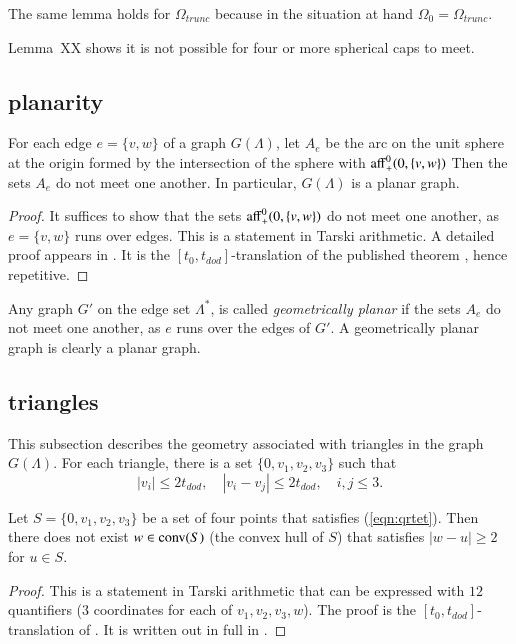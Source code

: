 The same lemma holds
for $\Omega_{trunc}$ because in the situation at hand $\Omega_0=\Omega_{trunc}$.

Lemma~XX shows it is not possible for four or more
spherical caps to meet.

\subsection{planarity}


\begin{lemma}  For each edge $e=\{v,w\}$ of a graph $G(\Lambda)$,
let $A_e$ be the arc on the unit sphere at the origin formed
by the intersection of the sphere with ${\operatorname{aff}}^0_+(0,\{v,w\})$
Then the sets $A_e$ do not meet one another.  In particular,
$G(\Lambda)$ is a planar graph.
\end{lemma}

\begin{proof}  It suffices to show that the sets
${\operatorname{aff}}^0_+(0,\{v,w\})$ do not meet one another, as $e=\{v,w\}$
runs over edges.  This is a statement in Tarski arithmetic.
A detailed proof appears in \cite[Lemma~3.2]{arx}.  
It is the $[t_0,t_{dod}]$-translation
of the published theorem \cite[Lemma~3.10]{Part1}, hence
repetitive.
\end{proof}

Any graph $G'$ on the edge set $\Lambda^*$, is called
{\it geometrically planar} if the sets $A_e$ do not meet one
another, as $e$ runs over the edges of $G'$.  A geometrically
planar graph is clearly a planar graph.

\subsection{triangles}

This subsection describes the geometry associated with
triangles in the graph $G(\Lambda)$.  For each triangle,
there is a set $\{0,v_1,v_2,v_3\}$ such that
\begin{equation}\label{eqn:qrtet}
  |v_i| \le 2t_{dod},\quad |v_i-v_j | \le 2 t_{dod},\quad i,j\le 3.
\end{equation}

\begin{lemma} Let $S=\{0,v_1,v_2,v_3\}$ be a set of four points
that satisfies (\ref{eqn:qrtet}).  Then
there does not exist $w\in{\operatorname{conv}}(S)$
(the convex hull of $S$) that satisfies $|w-u|\ge 2$ for 
$u\in S$.
\end{lemma}

\begin{proof}  This is a statement in Tarski arithmetic 
that can be expressed with $12$ quantifiers ($3$ coordinates
for each of $v_1,v_2,v_3,w$).  The proof is
the $[t_0,t_{dod}]$-translation of \cite[Lemma~4.15]{DCG}.
It is written out in full in \cite[Lemma~3.3]{arx}.
\end{proof}


